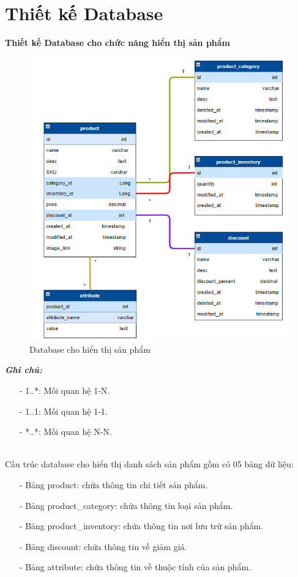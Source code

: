 \section{Thiết kế Database}
\textbf{Thiết kế Database cho chức năng hiển thị sản phẩm}
 \begin{figure}[H]
    \begin{center}
    \includegraphics[scale = 0.8]{images/phat/DB_catalog.jpg}
    \vspace*{7mm}
    \caption{Database cho hiển thị sản phẩm}
    \end{center}
    \label{}
\end{figure}
\textbf{\textit{Ghi chú:}}
\begin{itemize}
    \item [-] 1..*: Mối quan hệ 1-N.
    \item [-] 1..1: Mối quan hệ 1-1.
    \item [-] *..*: Mối quan hệ N-N.
\end{itemize}
\\
\noindent Cấu trúc database cho hiển thị danh sách sản phẩm gồm có 05 bảng dữ liệu:
\begin{itemize}
    \item [-] Bảng product: chứa thông tin chi tiết sản phẩm.
    \item [-] Bảng product\_category: chứa thông tin loại sản phẩm.
    \item [-] Bảng product\_inventory: chứa thông tin nơi lưu trữ sản phẩm.
    \item [-] Bảng discount: chứa thông tin về giảm giá.
    \item [-] Bảng attribute: chứa thông tin về thuộc tính của sản phẩm.
\end{itemize}
